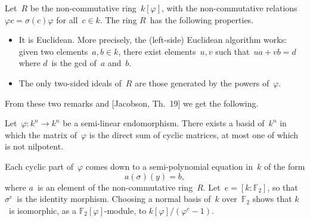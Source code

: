 \documentclass{article}
\def\mat#1{\begin{pmatrix}#1\end{pmatrix}}
\def\F{\mathbb{F}}
\begin{document}
Let~$R$ be the non-commutative ring~$k[φ]$, with the non-commutative
relations~$φ c = σ(c) φ$ for all~$c ∈ k$. The ring $R$~has the following
properties.
\begin{itemize}
\item It is Euclidean.
More precisely, the (left-side) Euclidean algorithm works: given two
elements~$a, b ∈ k$, there exist elements~$u, v$ such that~$u a + v b =
d$ where $d$~is the gcd of~$a$ and~$b$.
\item The only two-sided ideals of~$R$ are those generated by the powers
of~$φ$.
\end{itemize}

From these two remarks and [Jacobson, Th.~19] we get the following.
\begin{thm}
Let~$φ: k^n → k^n$ be a semi-linear endomorphism. There exists a basid
of~$k^n$ in which the matrix of~$φ$ is the direct sum of cyclic matrices,
at most one of which is not nilpotent.
\end{thm}

Each cyclic part of~$φ$ comes down to a semi-polynomial equation in~$k$
of the form
\begin{equation}
a(σ) (y) = b,
\end{equation}
where $a$~is an element of the non-commutative ring~$R$. Let~$e = [k:
\F_2]$, so that $σ^e$~is the identity morphism. Choosing a normal basis
of~$k$ over~$\F_2$ shows that $k$~is isomorphic, as a $\F_2[φ]$-module,
to $k[φ]/(φ^e-1)$.
\end{document}
